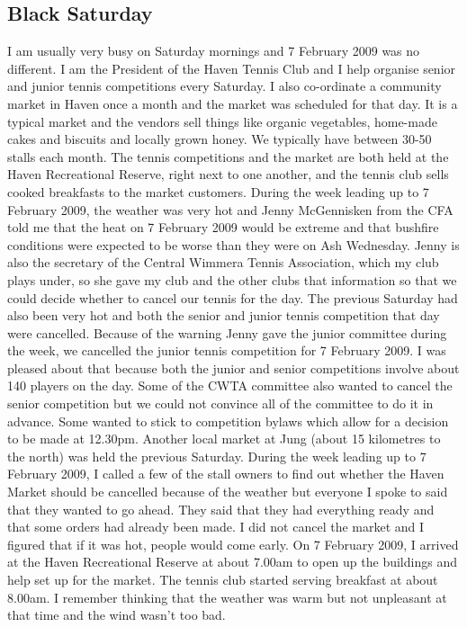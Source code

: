 \documentclass[a4paper]{article}
\begin{document}
\subsection{Black Saturday}

    I am usually very busy on Saturday mornings and 7 February 2009 was no different. I am the President of the Haven Tennis Club and I help organise senior and junior tennis competitions every Saturday. I also co-ordinate a community market in Haven once a month and the market was scheduled for that day. It is a typical market and the vendors sell things like organic vegetables, home-made cakes and biscuits and locally grown honey. We typically have between 30-50 stalls each month. The tennis competitions and the market are both held at the Haven Recreational Reserve, right next to one another, and the tennis club sells cooked breakfasts to the market customers.
    During the week leading up to 7 February 2009, the weather was very hot and Jenny McGennisken from the CFA told me that the heat on 7 February 2009 would be extreme and that bushfire conditions were expected to be worse than they were on Ash Wednesday. Jenny is also the secretary of the Central Wimmera Tennis Association, which my club plays under, so she gave my club and the other clubs that information so that we could decide whether to cancel our tennis for the day. The previous Saturday had also been very hot and both the senior and junior tennis competition that day were cancelled. Because of the warning Jenny gave the junior committee during the week, we cancelled the junior tennis competition for 7 February 2009. I was pleased about that because both the junior and senior competitions involve about 140 players on the day. Some of the CWTA committee also wanted to cancel the senior competition but we could not convince all of the committee to do it in advance. Some wanted to stick to competition bylaws which allow for a decision to be made at 12.30pm.
    Another local market at Jung (about 15 kilometres to the north) was held the previous Saturday. During the week leading up to 7 February 2009, I called a few of the stall owners to find out whether the Haven Market should be cancelled because of the weather but everyone I spoke to said that they wanted to go ahead. They said that they had everything ready and that some orders had already been made. I did not cancel the market and I figured that if it was hot, people would come early.
    On 7 February 2009, I arrived at the Haven Recreational Reserve at about 7.00am to open up the buildings and help set up for the market. The tennis club started serving breakfast at about 8.00am. I remember thinking that the weather was warm but not unpleasant at that time and the wind wasn't too bad.
\end{document}
